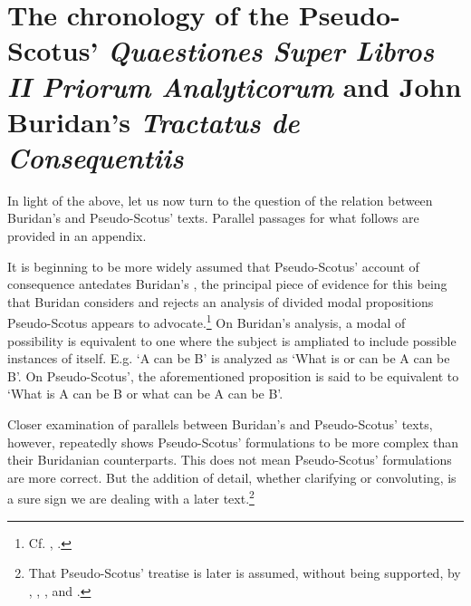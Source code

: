 \documentclass[]{article}
\begin{document}
\section{The chronology of the Pseudo-Scotus' \textit{Quaestiones Super Libros II Priorum Analyticorum} and John Buridan's \textit{Tractatus de Consequentiis}}
In light of the above, let us now turn to the question of the relation between Buridan's and Pseudo-Scotus' texts. Parallel passages for what follows are provided in an appendix.

It is beginning to be more widely assumed that Pseudo-Scotus' account of consequence antedates Buridan's \cite[ch. 6]{Lagerlund2000} \cite[pp. 252-253]{Johnston2015}  \cite[pp. 4-5]{Read2015}, the principal piece of evidence for this being that Buridan considers and rejects an analysis of divided modal propositions Pseudo-Scotus appears to advocate.\footnote{Cf. \cite[In anal. pr. I, q. 26, pp. 143-144]{Pseudo-Scotus1891}, \cite[TC II, 4, p. 97]{Buridan2015}.} On Buridan's analysis, a modal of possibility is equivalent to one where the subject is ampliated to include possible instances of itself. E.g. `A can be B' is analyzed as `What is or can be A can be B'. On Pseudo-Scotus', the aforementioned proposition is said to be equivalent to `What is A can be B or what can be A can be B'.

Closer examination of parallels between Buridan's and Pseudo-Scotus' texts, however, repeatedly shows Pseudo-Scotus' formulations to be more complex than their Buridanian counterparts. This does not mean Pseudo-Scotus' formulations are more correct. But the addition of detail, whether clarifying or convoluting, is a sure sign we are dealing with a later text.\footnote{That Pseudo-Scotus' treatise is later is assumed, without being supported, by \cite{Boh1982}, \cite{King2001}, \cite{DutilhNovaes2008}, and \cite{Knuuttila2008}.}
\end{document}
